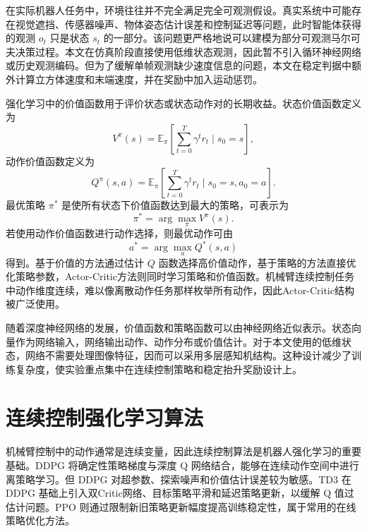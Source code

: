 \documentclass[
    type = bachelor,
    oneside,
    fontset = fandol
]{njuthesis}
\begin{document}
在实际机器人任务中，环境往往并不完全满足完全可观测假设。真实系统中可能存在视觉遮挡、传感器噪声、物体姿态估计误差和控制延迟等问题，此时智能体获得的观测 $o_t$ 只是状态 $s_t$ 的一部分。该问题更严格地说可以建模为部分可观测马尔可夫决策过程。本文在仿真阶段直接使用低维状态观测，因此暂不引入循环神经网络或历史观测编码。但为了缓解单帧观测缺少速度信息的问题，本文在稳定判据中额外计算立方体速度和末端速度，并在奖励中加入运动惩罚。

强化学习中的价值函数用于评价状态或状态动作对的长期收益。状态价值函数定义为
\begin{equation}
  V^{\pi}(s)=\mathbb{E}_{\pi}\left[\sum_{t=0}^{T}\gamma^t r_t \mid s_0=s\right],
\end{equation}
动作价值函数定义为
\begin{equation}
  Q^{\pi}(s,a)=\mathbb{E}_{\pi}\left[\sum_{t=0}^{T}\gamma^t r_t \mid s_0=s,a_0=a\right].
\end{equation}
最优策略 $\pi^*$ 是使所有状态下价值函数达到最大的策略，可表示为
\begin{equation}
  \pi^*=\arg\max_{\pi} V^{\pi}(s).
\end{equation}
若使用动作价值函数进行动作选择，则最优动作可由
\begin{equation}
  a^*=\arg\max_a Q^*(s,a)
\end{equation}
得到。基于价值的方法通过估计 $Q$ 函数选择高价值动作，基于策略的方法直接优化策略参数，Actor-Critic方法则同时学习策略和价值函数。机械臂连续控制任务中动作维度连续，难以像离散动作任务那样枚举所有动作，因此Actor-Critic结构被广泛使用。

随着深度神经网络的发展，价值函数和策略函数可以由神经网络近似表示。状态向量作为网络输入，网络输出动作、动作分布或价值估计。对于本文使用的低维状态，网络不需要处理图像特征，因而可以采用多层感知机结构。这种设计减少了训练复杂度，使实验重点集中在连续控制策略和稳定抬升奖励设计上。

\section{连续控制强化学习算法}

机械臂控制中的动作通常是连续变量，因此连续控制算法是机器人强化学习的重要基础。DDPG 将确定性策略梯度与深度 Q 网络结合，能够在连续动作空间中进行离策略学习\cite{lillicrap2015ddpg}。但 DDPG 对超参数、探索噪声和价值估计误差较为敏感。TD3 在 DDPG 基础上引入双Critic网络、目标策略平滑和延迟策略更新，以缓解 Q 值过估计问题\cite{fujimoto2018td3}。PPO 则通过限制新旧策略更新幅度提高训练稳定性，属于常用的在线策略优化方法\cite{schulman2017ppo}。
\end{document}
